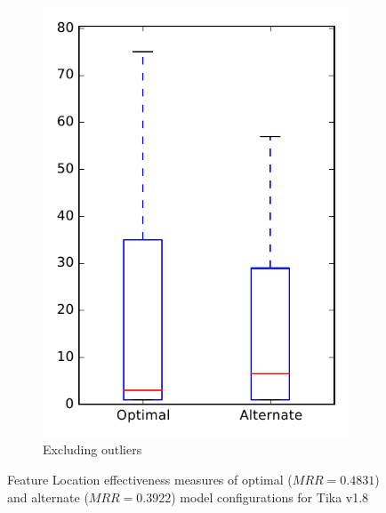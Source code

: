 \begin{figure}
\begin{subfigure}{.4\textwidth}
        \includegraphics[height=0.4\textheight]{figures/combo/flt_rq1_tika_no_outlier}
        \caption{Excluding outliers}\label{fig:combo:flt:rq1:tika_no_outlier}
    \end{subfigure}
\caption[Feature Location effectiveness measures of optimal and alternate model configurations for Tika v1.8]%
{Feature Location effectiveness measures of optimal ($MRR=0.4831$) and alternate ($MRR=0.3922$) model configurations for Tika v1.8}
\label{fig:combo:flt:rq1:tika}
\end{figure}
